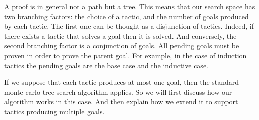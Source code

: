 \documentclass[runningheads,a4paper,draft]{svjour3}
\begin{document}
A proof is in general not a path but a tree. This means that our search space 
has two branching factors: 
the choice of a tactic, and the number of goals produced by each tactic.
The first one can be thought as a disjunction of tactics. Indeed, 
if there exists a tactic that solves a goal then it is solved. And 
conversely, the second branching factor is a conjunction of goals. All pending 
goals must be proven in order to prove the parent goal. For example, in the 
case of induction tactics the pending goals are the base case and the inductive 
case.

If we suppose that each tactic produces at most one goal, then the standard 
monte carlo tree search algorithm applies. So we will first discuss how our 
algorithm works in this case. And then explain how we extend it to support 
tactics producing 
multiple goals.


\end{document}
